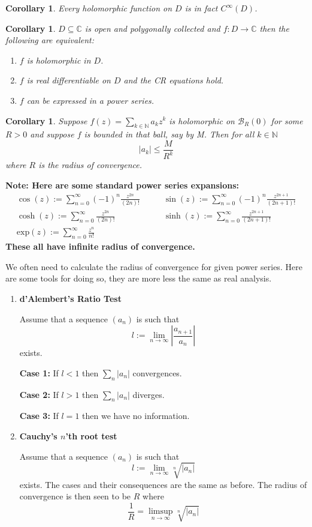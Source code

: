 \documentclass[11pt]{article}
\newcommand{\defeq}{:=}
\newcommand{\abs}[1]{\left|#1\right|}
\newcommand{\C}{\mathbb{C}}
\newcommand{\N}{\mathbb{N}}
\newenvironment{note}
	{\begin{mdframed}[backgroundcolor=white, linecolor=red, roundcorner=5pt, linewidth=1pt]\bfseries{Note:}\normalfont}
	{\end{mdframed}}
\newtheorem{cor}[theorem]{Corollary}
\begin{document}
\begin{cor}
	Every holomorphic function on $D$ is in fact $C^\infty(D)$.
\end{cor}

\begin{cor}
$D\subseteq \C$ is open and polygonally collected and $f:D\to\C$ then the following are equivalent:
\begin{enumerate}[label=(\roman*)]
	\item $f$ is holomorphic in $D$.
	\item $f$ is real differentiable on $D$ and the CR equations hold.
	\item $f$ can be expressed in a power series.
\end{enumerate}
\end{cor}

\begin{cor}
	Suppose $f(z)=\sum_{k\in\N}a_k z^k$ is holomorphic on $\mathcal{B}_R(0)$ for some $R>0$ and suppose $f$ is bounded in that ball, say by M.
	Then for all $k\in\N$
	\[
		\abs{a_k}\leq \frac{M}{R^k}
	\]
	where $R$ is the radius of convergence.
\end{cor}

\begin{note}
Here are some standard power series expansions:
\begin{align*}
	\cos(z) \defeq \sum_{n=0}^\infty (-1)^n \frac{z^{2n}}{(2n)!} \quad\quad &\sin(z) \defeq \sum_{n=0}^{\infty}(-1)^n \frac{z^{2n+1}}{(2n+1)!} \\
	\cosh(z) \defeq \sum_{n=0}^{\infty} \frac{z^{2n}}{(2n)!}   \quad\quad &\sinh(z) \defeq \sum_{n=0}^{\infty}\frac{z^{2n+1}}{(2n+1)!} \\
	\mathrm{exp}(z) \defeq \sum_{n=0}^{\infty}\frac{z^n}{n!} \quad\quad & \;
\end{align*}
These all have infinite radius of convergence.
\end{note}

We often need to calculate the radius of convergence for given power series.
Here are some tools for doing so, they are more less the same as real analysis.
\begin{enumerate}[label=(\roman*)]
	\item \textbf{d'Alembert's Ratio Test}

		Assume that a sequence $(a_n)$ is such that
		\[
			l\defeq\lim_{n\to\infty}\abs{\frac{a_{n+1}}{a_n}}
		\]
		exists.

		\textbf{Case 1: }If $l < 1$ then $\sum_{n}\abs{a_n}$ convergences.

		\textbf{Case 2: }If $l > 1$ then $\sum_{n}\abs{a_n}$ diverges.

		\textbf{Case 3: }If $l = 1$ then we have no information.

	\item \textbf{Cauchy's $n$'th root test}

		Assume that a sequence $(a_n)$ is such that
		\[
			l\defeq \lim_{n\to\infty}\sqrt[n]{\abs{a_n}}
		\]
		exists.
		The cases and their consequences are the same as before.
		The radius of convergence is then seen to be $R$ where
		\[
		\frac{1}{R}=\limsup_{n\to\infty}\sqrt[n]{\abs{a_n}}
		\]
\end{enumerate}
\end{document}

